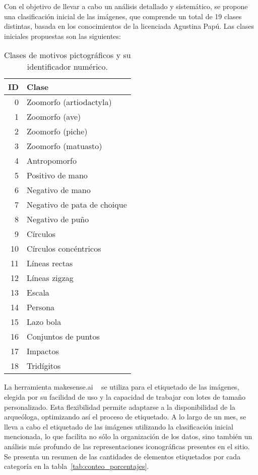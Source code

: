 Con el objetivo de llevar a cabo un análisis detallado y sistemático, se propone una clasificación inicial de las imágenes, que comprende un total de 19 clases distintas, basada en los conocimientos de la licenciada Agustina Papú.
Las clases iniciales propuestas son las siguientes:

\begin{table}[htpb]
    \centering
    \begin{tabular}{r l}
        \hline
        \textbf{ID} & \textbf{Clase} \\
        \hline
        0  & Zoomorfo (artiodactyla) \\
        1  & Zoomorfo (ave) \\
        2  & Zoomorfo (piche) \\
        3  & Zoomorfo (matuasto) \\
        4  & Antropomorfo \\
        5  & Positivo de mano \\
        6  & Negativo de mano \\
        7  & Negativo de pata de choique \\
        8  & Negativo de puño \\
        9  & Círculos \\
        10 & Círculos concéntricos \\
        11 & Líneas rectas \\
        12 & Líneas zigzag \\
        13 & Escala \\
        14 & Persona \\
        15 & Lazo bola \\
        16 & Conjuntos de puntos \\
        17 & Impactos \\
        18 & Tridígitos \\
    \end{tabular}
    \caption{Clases de motivos pictográficos y su identificador numérico.}
    \label{tab:clases-motivos}
\end{table}

La herramienta makesense.ai ~\cite{makesense} se utiliza para el etiquetado de las imágenes, elegida por su facilidad de uso y la capacidad de trabajar con lotes de tamaño personalizado.
Esta flexibilidad permite adaptarse a la disponibilidad de la arqueóloga, optimizando así el proceso de etiquetado.
A lo largo de un mes, se lleva a cabo el etiquetado de las imágenes utilizando la clasificación inicial mencionada, lo que facilita no sólo la organización de los datos, sino también un análisis más profundo de las representaciones iconográficas presentes en el sitio.
Se presenta un resumen de las cantidades de elementos etiquetados por cada categoría en la tabla~\ref{tab:conteo_porcentajes}.

